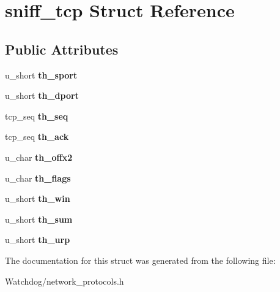 \hypertarget{structsniff__tcp}{\section{sniff\-\_\-tcp Struct Reference}
\label{structsniff__tcp}
}
\subsection*{Public Attributes}
\begin{DoxyCompactItemize}
\item 
\hypertarget{structsniff__tcp_a30dcb7e611d1f0c359e2146a8898dbeb}{u\-\_\-short {\bfseries th\-\_\-sport}}\label{structsniff__tcp_a30dcb7e611d1f0c359e2146a8898dbeb}

\item 
\hypertarget{structsniff__tcp_a8e67681937de43161ed5eeecd01272d0}{u\-\_\-short {\bfseries th\-\_\-dport}}\label{structsniff__tcp_a8e67681937de43161ed5eeecd01272d0}

\item 
\hypertarget{structsniff__tcp_a3732bf2f28ede2be85a628faa7b9347c}{tcp\-\_\-seq {\bfseries th\-\_\-seq}}\label{structsniff__tcp_a3732bf2f28ede2be85a628faa7b9347c}

\item 
\hypertarget{structsniff__tcp_a5d7e4a998411a138b50ca3950c172212}{tcp\-\_\-seq {\bfseries th\-\_\-ack}}\label{structsniff__tcp_a5d7e4a998411a138b50ca3950c172212}

\item 
\hypertarget{structsniff__tcp_a96031b46089f404631f459c46b4a9eea}{u\-\_\-char {\bfseries th\-\_\-offx2}}\label{structsniff__tcp_a96031b46089f404631f459c46b4a9eea}

\item 
\hypertarget{structsniff__tcp_aaec4001301328a04ff3e653f688d9c19}{u\-\_\-char {\bfseries th\-\_\-flags}}\label{structsniff__tcp_aaec4001301328a04ff3e653f688d9c19}

\item 
\hypertarget{structsniff__tcp_ad2e0599bbc042e63260bcd3fd07b55c5}{u\-\_\-short {\bfseries th\-\_\-win}}\label{structsniff__tcp_ad2e0599bbc042e63260bcd3fd07b55c5}

\item 
\hypertarget{structsniff__tcp_a1947a34af9e1c1467142c62602e94065}{u\-\_\-short {\bfseries th\-\_\-sum}}\label{structsniff__tcp_a1947a34af9e1c1467142c62602e94065}

\item 
\hypertarget{structsniff__tcp_aa9d57ded7709e0c610048df3ac80ab65}{u\-\_\-short {\bfseries th\-\_\-urp}}\label{structsniff__tcp_aa9d57ded7709e0c610048df3ac80ab65}

\end{DoxyCompactItemize}


The documentation for this struct was generated from the following file\-:\begin{DoxyCompactItemize}
\item 
Watchdog/network\-\_\-protocols.\-h\end{DoxyCompactItemize}
